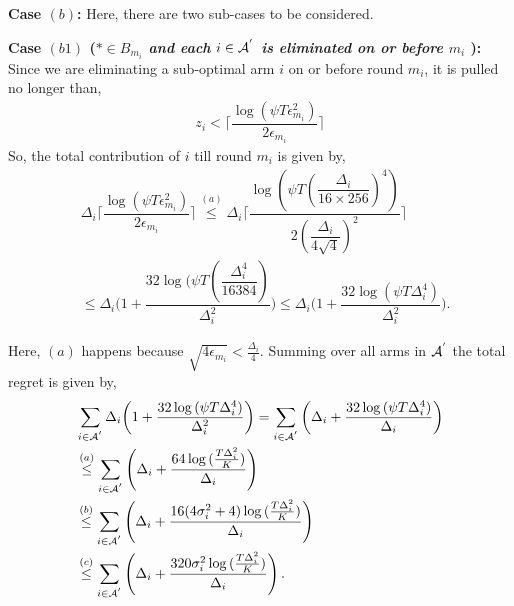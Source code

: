 \begin{customproof}{1}
\textbf{Case $(b)$:} Here, there are two sub-cases to be considered.

\noindent
\textbf{Case $(b1)$ (\textit{${*}\in B_{m_{i}}$ and each ${i}\in \mathcal{A}^{'}$ is  eliminated on or before $m_{i}$ }): } Since we are eliminating a sub-optimal arm ${i}$ on or before round $m_{i}$, it is pulled no longer than, 
 \begin{align*}
 z_{i} < \bigg\lceil\dfrac{\log{(\psi T\epsilon_{m_{i}}^{2})}}{2\epsilon_{m_{i}}}\bigg\rceil
 \end{align*}
So, the total contribution of ${i}$  till round $m_{i}$ is given by, 
\begin{align*}
&\Delta_{i}\bigg\lceil\dfrac{\log{(\psi T\epsilon_{m_{i}}^{2})}}{2\epsilon_{m_{i}}}\bigg\rceil
\overset{(a)}{\leq}    \Delta_{i}\bigg\lceil\dfrac{\log{(\psi T(\dfrac{\Delta_{i}}{16 \times 256})^{4})}}{2(\dfrac{\Delta_{i}}{4\sqrt{4}})^{2}}\bigg\rceil \\
&\leq   \Delta_{i}\bigg(1+\dfrac{32\log{(\psi T(\dfrac{\Delta_{i}^{4}}{16384})}}{\Delta_{i}^{2}}\bigg)
\leq \Delta_{i}\bigg(1+\dfrac{32\log{(\psi T\Delta_{i}^{4})}}{\Delta_{i}^{2}}\bigg) .
\end{align*} 

Here, $(a)$ happens because $\sqrt{4\epsilon_{m_{i}}} < \frac{\Delta_{i}}{4}$. Summing over all arms in $\mathcal{A}^{'}$ the total regret is given by, 
\begin{align*}
&\sum_{i\in \A^{'}}\Delta_{i}\bigg(1+\dfrac{32\log{(\psi T\Delta_{i}^{4}})}{\Delta_{i}^{2}}\bigg) = \sum_{i\in \A^{'}}\bigg(\Delta_{i} +\dfrac{32\log{(\psi T\Delta_{i}^{4}})}{\Delta_{i}}\bigg) \\
&\overset{(a)}{\leq} \sum_{i\in \A^{'}} \left(\Delta_{i}+\dfrac{64\log{( \frac{T\Delta_{i}^{2}}{K})}}{\Delta_{i}}\right)\\
&\overset{(b)}{\leq} \sum_{i\in \A^{'}} \left(\Delta_{i} +\dfrac{16(4\sigma_i^2 + 4)\log{( \frac{T\Delta_{i}^{2}}{K})}}{\Delta_{i}}\right)\\
&%
\overset{(c)}{\leq} \sum_{i\in \A^{'}} \left(\Delta_{i} +\dfrac{320\sigma_i^2\log{( \frac{T\Delta_{i}^{2}}{K})}}{\Delta_{i}}\right).\\
\end{align*}


\end{customproof}
